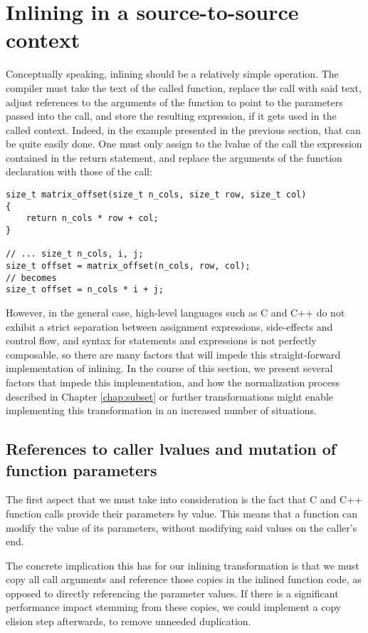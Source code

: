 \section{Inlining in a source-to-source context}

Conceptually speaking, inlining should be a relatively simple operation. The compiler must take the text of the called function, replace the call with said text, adjust references to the arguments of the function to point to the parameters passed into the call, and store the resulting expression, if it gets used in the called context. Indeed, in the example presented in the previous section, that can be quite easily done. One must only assign to the lvalue of the call the expression contained in the return statement, and replace the arguments of the function declaration with those of the call:

\begin{lstlisting}
size_t matrix_offset(size_t n_cols, size_t row, size_t col)
{
    return n_cols * row + col;
}

// ... size_t n_cols, i, j;
size_t offset = matrix_offset(n_cols, row, col);
// becomes
size_t offset = n_cols * i + j;
\end{lstlisting}

However, in the general case, high-level languages such as C and C++ do not exhibit a strict separation between assignment expressions, side-effects and control flow, and syntax for statements and expressions is not perfectly composable, so there are many factors that will impede this straight-forward implementation of inlining. In the course of this section, we present several factors that impede this implementation, and how the normalization process described in Chapter \ref{chap:subset} or further transformations might enable implementing this transformation in an increased number of situations.

\subsection{References to caller lvalues and mutation of function parameters}

The first aspect that we must take into consideration is the fact that C and C++ function calls provide their parameters by value. This means that a function can modify the value of its parameters, without modifying said values on the caller's end.

The concrete implication this has for our inlining transformation is that we must copy all call arguments and reference those copies in the inlined function code, as opposed to directly referencing the parameter values. If there is a significant performance impact stemming from these copies, we could implement a copy elision step afterwards, to remove unneeded duplication.

